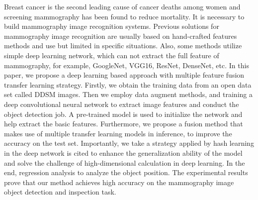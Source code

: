 Breast cancer is the second leading cause of 
cancer deaths among women and screening 
mammography has been found to reduce 
mortality. It is necessary to build 
mammography image recognition systems. 
Previous solutions for mammography image 
recognition are usually based on hand-crafted 
features methods and use but limited in 
specific situations. Also, some methods 
utilize simple deep learning network, which 
can not extract the full feature of mammography,
for example, GoogleNet, VGG16, ResNet, DenseNet, etc.
In this paper, we propose a deep learning based 
approach with multiple feature fusion transfer 
learning strategy. Firstly, we obtain the 
training data from an open data set called 
DDSM images. Then we employ data augment 
methods, and training a deep convolutional 
neural network to extract image features and 
conduct the object detection job. 
A pre-trained model is used to initialize the 
network and help extract the basic features.
Furthermore, we propose a fusion method that 
makes use of multiple transfer learning models 
in inference, to improve the accuracy on the 
test set. Importantly, we take a strategy 
applied by hash learning in the deep network 
is cited to enhance the generalization ability 
of the model and solve the challenge of 
high-dimensional calculation in deep learning. 
In the end, regression analysis to analyze 
the object position. The experimental results 
prove that our method achieves high accuracy on 
the mammography image object detection 
and inspection task.